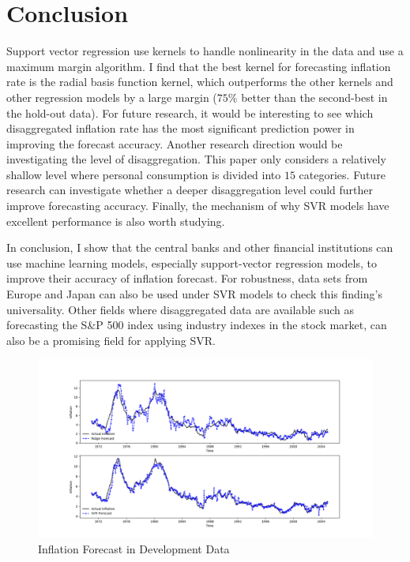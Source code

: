 \documentclass[10pt,twocolumn,letterpaper]{article}
\begin{document}
\section{Conclusion}
Support vector regression use kernels to handle nonlinearity in the data and use a maximum margin algorithm. I find that the best kernel for forecasting inflation rate is the radial basis function kernel, which outperforms the other kernels and other regression models by a large margin ($75\%$ better than the second-best in the hold-out data). For future research, it would be interesting to see which disaggregated inflation rate has the most significant prediction power in improving the forecast accuracy. Another research direction would be investigating the level of disaggregation. This paper only considers a relatively shallow level where personal consumption is divided into $15$ categories. Future research can investigate whether a deeper disaggregation level could further improve forecasting accuracy. Finally, the mechanism of why SVR models have excellent performance is also worth studying.

In conclusion, I show that the central banks and other financial institutions can use machine learning models, especially support-vector regression models, to improve their accuracy of inflation forecast. For robustness, data sets from Europe and Japan can also be used under SVR models to check this finding's universality. Other fields where disaggregated data are available such as forecasting the S\&P 500 index using industry indexes in the stock market, can also be a promising field for applying SVR. 

\begin{figure}
\begin{center}
\includegraphics[scale=0.48]{../../Python/Forecast_Dev.png}
\caption{Inflation Forecast in Development Data}
\end{center}
\end{figure}
\end{document}

